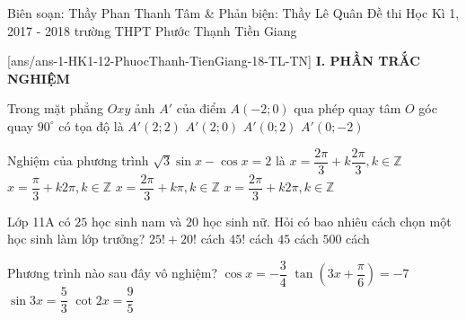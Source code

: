 
\begin{name}
{Biên soạn: Thầy Phan Thanh Tâm \& Phản biện: Thầy Lê Quân}
{Đề thi Học Kì 1, 2017 - 2018 trường THPT Phước Thạnh Tiền Giang}
\end{name}
\setcounter{ex}{0}\setcounter{bt}{0}
[ans/ans-1-HK1-12-PhuocThanh-TienGiang-18-TL-TN]
\noindent\textbf{I. PHẦN TRẮC NGHIỆM}
\begin{ex}%
	Trong mặt phẳng $ Oxy $ ảnh $ A' $ của điểm $ A(-2;0) $ qua phép quay tâm $ O $ góc quay $ 90^\circ $ có tọa độ là
	\choice
	{$ A'(2;2) $}
	{$ A'(2;0) $}
	{$ A'(0;2) $}
	{\True $ A'(0;-2) $}
\end{ex}
\begin{ex}%
	Nghiệm của phương trình $ \sqrt{3}\sin x-\cos x=2 $ là
	\choice
	{$ x=\dfrac{2\pi}{3}+k\dfrac{2\pi}{3},k\in\mathbb{Z} $}
	{$ x=\dfrac{\pi}{3}+k2\pi,k\in\mathbb{Z} $}
	{$ x=\dfrac{2\pi}{3}+k\pi,k\in\mathbb{Z} $}
	{\True $ x=\dfrac{2\pi}{3}+k2\pi,k\in\mathbb{Z} $}
\end{ex}
\begin{ex}%
	Lớp 11A có $ 25 $ học sinh nam và $ 20 $ học sinh nữ. Hỏi có bao nhiêu cách chọn một học sinh làm lớp trưởng?
	\choice
	{$ 25!+20! $ cách}
	{$ 45! $ cách}
	{\True $ 45 $ cách}
	{$ 500 $ cách}
\end{ex}
\begin{ex}%
	Phương trình nào sau đây vô nghiệm?
	\choice
	{$ \cos x=-\dfrac{3}{4} $}
	{$ \tan\left(3x+\dfrac{\pi}{6}\right)=-7$}
	{\True $ \sin 3x=\dfrac{5}{3} $}
	{$ \cot 2x=\dfrac{9}{5} $}
\end{ex}
